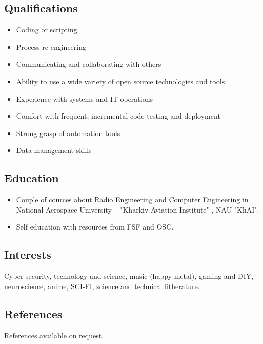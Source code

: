 \documentclass[11pt]{article}
\begin{document}
\subsection{Qualifications}
\label{sec:orgda3de23}

\begin{itemize}
\item Coding or scripting
\item Process re‑engineering
\item Communicating and collaborating with others
\item Ability to use a wide variety of open source technologies and tools
\item Experience with systems and IT operations
\item Comfort with frequent, incremental code testing and deployment
\item Strong grasp of automation tools
\item Data management skills
\end{itemize}

\subsection{Education}
\label{sec:org94d5234}

\begin{itemize}
\item Couple of cources about Radio Engineering and Computer Engineering in National Aerospace University – "Kharkiv Aviation Institute" , NAU "KhAI".
\item Self education with resources from FSF and OSC.
\end{itemize}

\subsection{Interests}
\label{sec:org9ded115}

Cyber security, technology and science, music (happy metal), gaming and DIY, neuroscience, anime, SCI-FI, science and technical litherature.

\subsection{References}
\label{sec:org4f80e16}

References available on request.
\end{document}
